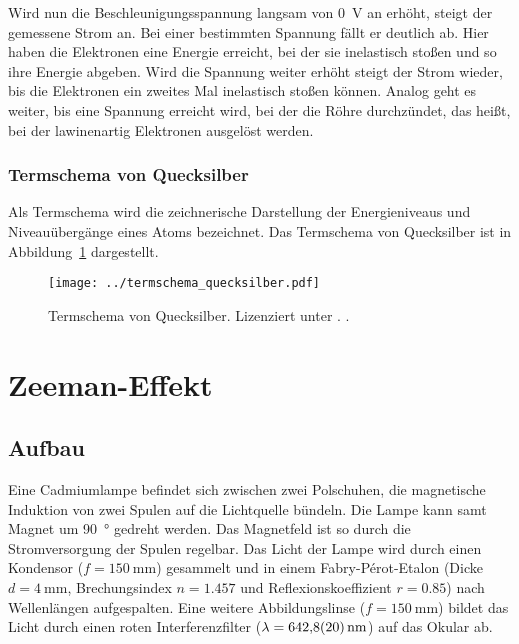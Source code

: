 Wird nun die Beschleunigungsspannung langsam von \SI{0}{\volt} an erhöht, steigt
der gemessene Strom an. Bei einer bestimmten Spannung fällt er deutlich ab.
Hier haben die Elektronen eine Energie erreicht, bei der sie inelastisch stoßen
und so ihre Energie abgeben. Wird die Spannung weiter erhöht steigt der Strom
wieder, bis die Elektronen ein zweites Mal inelastisch stoßen können. Analog
geht es weiter, bis eine Spannung erreicht wird, bei der die Röhre durchzündet,
das heißt, bei der lawinenartig Elektronen ausgelöst werden.

\subsection{Termschema von Quecksilber}

Als Termschema wird die zeichnerische Darstellung der Energieniveaus und
Niveauübergänge eines Atoms bezeichnet. Das Termschema von Quecksilber ist in
Abbildung~\ref{fig:Termschema} dargestellt.

\begin{figure}[htbp]
    \centering
    \texttt{[image: ../termschema\_quecksilber.pdf]}
    \caption{%
        Termschema von Quecksilber. Lizenziert unter \ccbyncsa.
        \parencite{Kraehling/Termschema_Quecksilber}.
    }
    \label{fig:Termschema}
\end{figure}

\chapter{Zeeman-Effekt}

\section{Aufbau}

Eine Cadmiumlampe befindet sich zwischen zwei Polschuhen, die magnetische
Induktion von zwei Spulen auf die Lichtquelle bündeln. Die Lampe kann samt
Magnet um \SI{90}{\degree} gedreht werden. Das Magnetfeld ist so
durch die Stromversorgung der Spulen regelbar. Das Licht der Lampe wird
durch einen Kondensor ($f = \SI{150}{\milli\meter}$) gesammelt und in einem
Fabry-Pérot-Etalon (Dicke $d = \SI{4}{\milli\meter}$, Brechungsindex $n =
\num{1.457}$ und Reflexionskoeffizient $r = \num{0.85}$) nach Wellenlängen
aufgespalten. Eine weitere Abbildungslinse ($f = \SI{150}{\milli\meter}$)
bildet das Licht durch einen roten Interferenzfilter ($\lambda = \SI{642.8 +-
2.0}{\nano\meter}$) auf das Okular ab.

